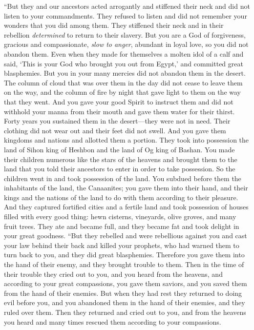 \begin{biblechapter}
\verse “But they and our ancestors acted arrogantly and stiffened their neck and did not listen to your commandments.
\verse They refused to listen and did not remember your wonders that you did among them. They stiffened their neck and in their rebellion \textit{determined} to return to their slavery. But you are a God of forgiveness, gracious and compassionate, \textit{slow to anger}, abundant in loyal love, so you did not abandon them.
\verse Even when they made for themselves a molten idol of a calf and said, ‘This is your God who brought you out from Egypt,’ and committed great blasphemies.
\verse But you in your many mercies did not abandon them in the desert. The column of cloud that was over them in the day did not cease to leave them on the way, and the column of fire by night that gave light to them on the way that they went.
\verse And you gave your good Spirit to instruct them and did not withhold your manna from their mouth and gave them water for their thirst.
\verse Forty years you sustained them in the desert—they were not in need. Their clothing did not wear out and their feet did not swell.
\verse And you gave them kingdoms and nations and allotted them a portion. They took into possession the land of Sihon king of Heshbon and the land of Og king of Bashan.
\verse You made their children numerous like the stars of the heavens and brought them to the land that you told their ancestors to enter in order to take possession.
\verse So the children went in and took possession of the land. You subdued before them the inhabitants of the land, the Canaanites; you gave them into their hand, and their kings and the nations of the land to do with them according to their pleasure.
\verse And they captured fortified cities and a fertile land and took possession of houses filled with every good thing: hewn cisterns, vineyards, olive groves, and many fruit trees. They ate and became full, and they became fat and took delight in your great goodness.
\verse “But they rebelled and were rebellious against you and cast your law behind their back and killed your prophets, who had warned them to turn back to you, and they did great blasphemies.
\verse Therefore you gave them into the hand of their enemy, and they brought trouble to them. Then in the time of their trouble they cried out to you, and you heard from the heavens, and according to your great compassions, you gave them saviors, and you saved them from the hand of their enemies.
\verse But when they had rest they returned to doing evil before you, and you abandoned them in the hand of their enemies, and they ruled over them. Then they returned and cried out to you, and from the heavens you heard and many times rescued them according to your compassions.

\end{biblechapter}
